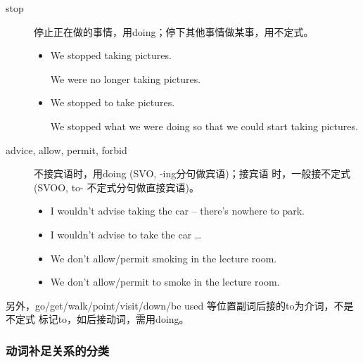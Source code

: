 \begin{description}
\item[stop] 停止正在做的事情，用doing；停下其他事情做某事，用不定式。
  \begin{itemize}
  \item We stopped taking pictures.

    We were no longer taking pictures.


  \item We stopped to take pictures.

    We stopped what we were doing so that we could start taking pictures.
  \end{itemize}

\item[advice, allow, permit, forbid] 不接宾语时，用doing (SVO, -ing分句做宾语)；接宾语
  时，一般接不定式 (SVOO, to- 不定式分句做直接宾语)。
  \begin{itemize}
  \item I wouldn't advise taking the car – there's nowhere to park.
  \item I wouldn't advise  to take the car …
  \item We don't allow/permit smoking in the lecture room.
  \item We don't allow/permit  to smoke in the lecture room.
  \end{itemize}
\end{description}

另外，go/get/walk/point/visit/down/be used 等位置副词后接的to为介词，不是不定式
标记to，如后接动词，需用doing。

\subsubsection{动词补足关系的分类}

